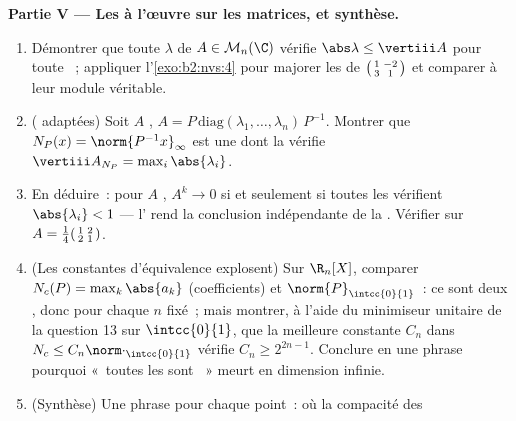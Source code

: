 \begin{problem}
\medskip
\noindent\textbf{Partie V --- Les  à l'œuvre sur les matrices, et
synthèse.}
\begin{enumerate}[resume]
  \item Démontrer que toute  $\lambda$ de $A \in
        \mathcal{M}_n(\C)$ vérifie $\abs\lambda \leq
        \vertiii A$ pour toute ~; appliquer
        l'\cref{exo:b2:nvs:4} pour majorer les  de
        $\begin{psmallmatrix}1 & -2\\ 3 & 1\end{psmallmatrix}$
        et comparer à leur module véritable.
  \item ( adaptées) Soit $A$ , $A =
        P\,\mathrm{diag}(\lambda_1, \dots, \lambda_n)\,P^{-1}$.
        Montrer que $N_P(x) = \norm{P^{-1}x}_\infty$ est une  dont la
         vérifie $\vertiii A_{N_P} =
        \max_i\abs{\lambda_i}$.
  \item En déduire~: pour $A$ , $A^k \to 0$ si et
        seulement si toutes les  vérifient $\abs{\lambda_i} < 1$ ---
        l' rend la conclusion
        indépendante de la . Vérifier sur $A =
        \frac14\begin{psmallmatrix}1 & 2\\ 2 &
        1\end{psmallmatrix}$.
  \item (Les constantes d'équivalence explosent) Sur $\R_n[X]$,
        comparer $N_c(P) = \max_k \abs{a_k}$ (coefficients) et
        $\norm{P}_{\intcc{0}{1}}$~: ce sont deux , donc
         pour chaque $n$ fixé~; mais montrer, à l'aide du
        minimiseur unitaire de la question 13 sur $\intcc{0}{1}$, que la
        meilleure constante $C_n$ dans $N_c \leq
        C_n\norm\cdot_{\intcc{0}{1}}$ vérifie $C_n \geq
        2^{2n-1}$. Conclure en une phrase pourquoi «~toutes les 
        sont ~» meurt en dimension infinie.
  \item (Synthèse) Une phrase pour chaque point~: où la compacité des

\end{enumerate}
\end{problem}
